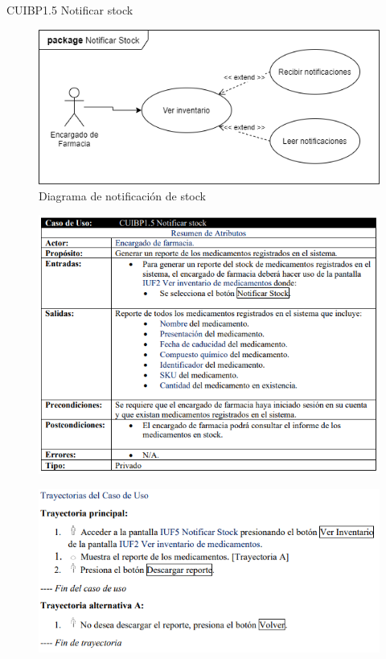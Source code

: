 \documentclass[12pt,letterpaper]{article}
\begin{document}
             \newpage
            CUIBP1.5 Notificar stock
            \begin{figure}[H]
                \centering
                \includegraphics [scale=0.5]{casosUso/notificarStock}
                \caption{Diagrama de notificación de stock}
            \end{figure}
            \begin{figure}[H]
                \centering
                \includegraphics [scale=0.8]{specs/specNotificarStock}
            \end{figure}
            \begin{figure}[H]
                \centering
                \includegraphics [scale=0.9]{specs/trayNotificarStock}
            \end{figure}
\end{document}
